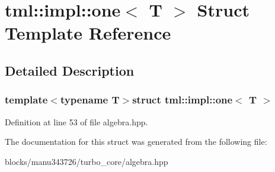 \hypertarget{structtml_1_1impl_1_1one}{\section{tml\+:\+:impl\+:\+:one$<$ T $>$ Struct Template Reference}
\label{structtml_1_1impl_1_1one}
}


\subsection{Detailed Description}
\subsubsection*{template$<$typename T$>$struct tml\+::impl\+::one$<$ T $>$}



Definition at line 53 of file algebra.\+hpp.



The documentation for this struct was generated from the following file\+:\begin{DoxyCompactItemize}
\item 
blocks/manu343726/turbo\+\_\+core/algebra.\+hpp\end{DoxyCompactItemize}
